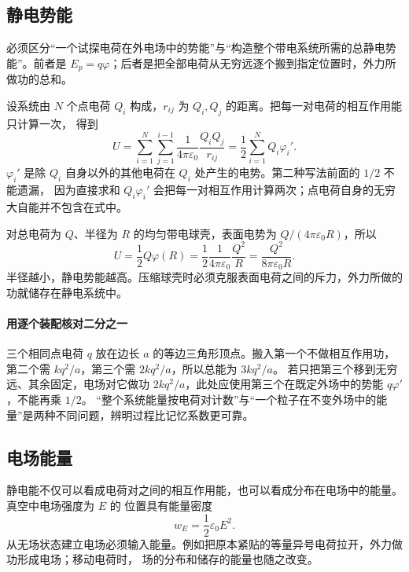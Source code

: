 \subsection*{静电势能}

必须区分“一个试探电荷在外电场中的势能”与“构造整个带电系统所需的总静电势能”。前者是
$E_p=q\varphi$；后者是把全部电荷从无穷远逐个搬到指定位置时，外力所做功的总和。

设系统由 $N$ 个点电荷 $Q_i$ 构成，$r_{ij}$ 为 $Q_i,Q_j$ 的距离。把每一对电荷的相互作用能只计算一次，
得到
\begin{equation}
  \boxed{U=\sum_{i=1}^{N}\sum_{j=1}^{i-1}
  \frac{1}{4\pi\varepsilon_0}\frac{Q_iQ_j}{r_{ij}}
  =\frac12\sum_{i=1}^{N}Q_i\varphi_i'}.
\end{equation}
$\varphi_i'$ 是除 $Q_i$ 自身以外的其他电荷在 $Q_i$ 处产生的电势。第二种写法前面的 $1/2$ 不能遗漏，
因为直接求和 $Q_i\varphi_i'$ 会把每一对相互作用计算两次；点电荷自身的无穷大自能并不包含在式中。

对总电荷为 $Q$、半径为 $R$ 的均匀带电球壳，表面电势为
$Q/(4\pi\varepsilon_0R)$，所以
\begin{equation}
  \label{shell-energy}\boxed{U=\frac12Q\varphi(R)
  =\frac{1}{2}\frac{1}{4\pi\varepsilon_0}\frac{Q^2}{R}}
  =\boxed{\frac{Q^2}{8\pi\varepsilon_0R}}.
\end{equation}
半径越小，静电势能越高。压缩球壳时必须克服表面电荷之间的斥力，外力所做的功就储存在静电系统中。


\paragraph{用逐个装配核对二分之一}
三个相同点电荷 $q$ 放在边长 $a$ 的等边三角形顶点。搬入第一个不做相互作用功，第二个需 $kq^2/a$，第三个需 $2kq^2/a$，所以总能为 $3kq^2/a$。
若只把第三个移到无穷远、其余固定，电场对它做功 $2kq^2/a$，此处应使用第三个在既定外场中的势能 $q\varphi'$，不能再乘 $1/2$。
“整个系统能量按电荷对计数”与“一个粒子在不变外场中的能量”是两种不同问题，辨明过程比记忆系数更可靠。

\subsection*{电场能量}

静电能不仅可以看成电荷对之间的相互作用能，也可以看成分布在电场中的能量。真空中电场强度为 $E$ 的
位置具有能量密度
\begin{equation}
  \boxed{w_E=\frac12\varepsilon_0E^2}.
\end{equation}
从无场状态建立电场必须输入能量。例如把原本紧贴的等量异号电荷拉开，外力做功形成电场；移动电荷时，
场的分布和储存的能量也随之改变。


